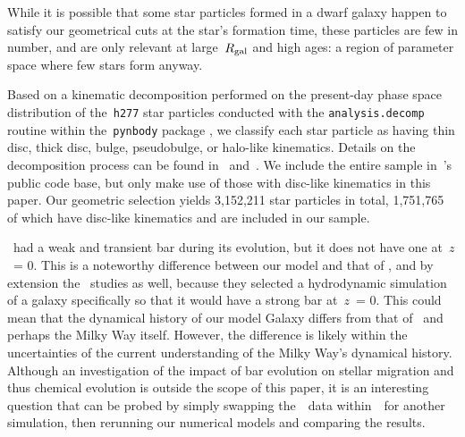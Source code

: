 \documentclass[draft2.tex]{subfiles}
\begin{document}
While it is possible that some star particles formed in a dwarf galaxy happen 
to satisfy our geometrical cuts at the star's formation time, these particles 
are few in number, and are only relevant at large~$R_\text{gal}$ and high 
ages: a region of parameter space where few stars form anyway. 
\par 
Based on a kinematic decomposition performed on the present-day phase space 
distribution of the~\texttt{h277} star particles conducted with the 
\texttt{analysis.decomp} routine within the~\texttt{pynbody} package 
\citep{pynbody}, we classify each star particle as having thin disc, thick 
disc, bulge, pseudobulge, or halo-like kinematics.
Details on the decomposition process can be found in~\citet{Brook2012} 
and~\citet{Bird2013}. 
We include the entire sample in~\vice's public code base, but only make use of 
those with disc-like kinematics in this paper. 
Our geometric selection yields 3,152,211 star particles in total, 1,751,765 of 
which have disc-like kinematics and are included in our sample. 
\par 
\hsim~had a weak and transient bar during its evolution, but it does not have 
one at~$z$~= 0. 
This is a noteworthy difference between our model and that of 
\citet{Minchev2013}, and by extension the~\citet{Minchev2014, Minchev2017} 
studies as well, because they selected a hydrodynamic simulation of a galaxy 
specifically so that it would have a strong bar at~$z$~= 0. 
This could mean that the dynamical history of our model Galaxy differs from 
that of~\citet{Minchev2013} and perhaps the Milky Way itself. 
However, the difference is likely within the uncertainties of the current 
understanding of the Milky Way's dynamical history. 
Although an investigation of the impact of bar evolution on stellar migration 
and thus chemical evolution is outside the scope of this paper, it is an 
interesting question that can be probed by simply swapping the~\hsim~data 
within~\vice~for another simulation, then rerunning our numerical models and 
comparing the results. 
\end{document}
